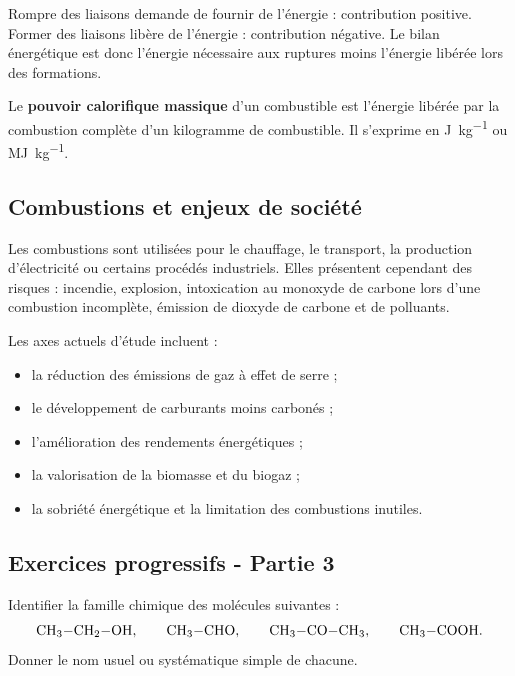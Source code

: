 \documentclass[11pt,a4paper]{article}
\begin{document}
\begin{demobox}
Rompre des liaisons demande de fournir de l'énergie : contribution positive. Former des liaisons libère de l'énergie : contribution négative. Le bilan énergétique est donc l'énergie nécessaire aux ruptures moins l'énergie libérée lors des formations.
\end{demobox}

\begin{definitionbox}
Le \textbf{pouvoir calorifique massique} d'un combustible est l'énergie libérée par la combustion complète d'un kilogramme de combustible. Il s'exprime en \si{J.kg^{-1}} ou \si{MJ.kg^{-1}}.
\end{definitionbox}

\subsection{Combustions et enjeux de société}

Les combustions sont utilisées pour le chauffage, le transport, la production d'électricité ou certains procédés industriels. Elles présentent cependant des risques : incendie, explosion, intoxication au monoxyde de carbone lors d'une combustion incomplète, émission de dioxyde de carbone et de polluants.

\begin{retenirbox}
Les axes actuels d'étude incluent :
\begin{itemize}
\item la réduction des émissions de gaz à effet de serre ;
\item le développement de carburants moins carbonés ;
\item l'amélioration des rendements énergétiques ;
\item la valorisation de la biomasse et du biogaz ;
\item la sobriété énergétique et la limitation des combustions inutiles.
\end{itemize}
\end{retenirbox}

\subsection{Exercices progressifs - Partie 3}

\begin{exercicebox}[title=Exercice 9 - Groupes caractéristiques]
Identifier la famille chimique des molécules suivantes :
\[
\ce{CH3-CH2-OH},\qquad \ce{CH3-CHO},\qquad \ce{CH3-CO-CH3},\qquad \ce{CH3-COOH}.
\]
Donner le nom usuel ou systématique simple de chacune.
\end{exercicebox}
\end{document}
